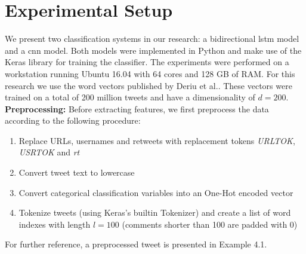 \documentclass[11pt]{article}
\begin{document}
\section{Experimental Setup}
We present two classification systems in our research: a bidirectional \ac{lstm} model and a \ac{cnn} model. Both models were implemented in Python and make use of the Keras library \cite{RN64} for training the classifier. The experiments were performed on a workstation running Ubuntu 16.04 with 64 cores and 128 GB of RAM.
\newline
For this research we use the word vectors published by Deriu et al.. These vectors were trained on a total of 200 million tweets and have a dimensionality of $d=200$.
\newline
\textbf{Preprocessing: }
Before extracting features, we first preprocess the data according to the following procedure:
\begin{enumerate}[topsep=1.5pt,itemsep=-1ex,partopsep=1ex,parsep=1ex] 
  \item Replace URLs, usernames and retweets with replacement tokens \textit{URLTOK}, \textit{USRTOK} and \textit{rt}
  \item Convert tweet text to lowercase
  \item Convert categorical classification variables into an One-Hot encoded vector
  \item Tokenize tweets (using Keras's builtin Tokenizer) and create a list of word indexes with length $l=100$ (comments shorter than 100 are padded with 0)
\end{enumerate}
For further reference, a preprocessed tweet is presented in Example 4.1.
\newline
\noindent{}
\end{document}
